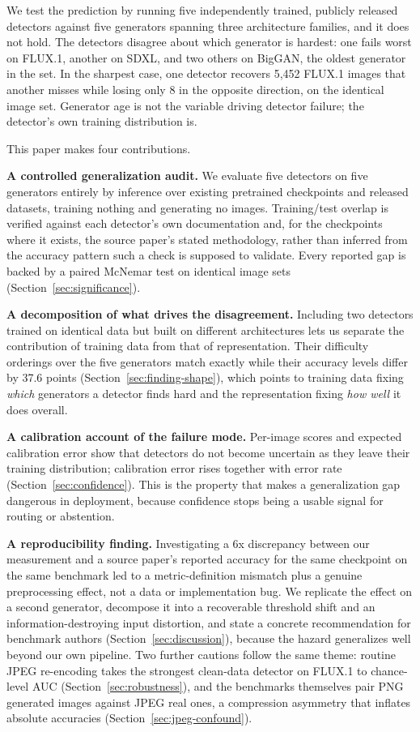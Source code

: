 \documentclass[3p,times,procedia]{elsarticle}
\begin{document}
We test the prediction by running five independently trained, publicly
released detectors against five generators spanning three architecture
families, and it does not hold. The detectors disagree about which
generator is hardest: one fails worst on FLUX.1, another on SDXL, and two
others on BigGAN, the oldest generator in the set. In the sharpest case,
one detector recovers 5{,}452 FLUX.1 images that another misses while
losing only 8 in the opposite direction, on the identical image set.
Generator age is not the variable driving detector failure; the detector's
own training distribution is.

This paper makes four contributions.

\textbf{A controlled generalization audit.} We evaluate five detectors on
five generators entirely by inference over existing pretrained checkpoints
and released datasets, training nothing and generating no images.
Training/test overlap is verified against each detector's own documentation
and, for the checkpoints where it exists, the source paper's stated
methodology, rather than inferred from the accuracy pattern such a check is
supposed to validate. Every reported gap is backed by a paired McNemar test
on identical image sets (Section~\ref{sec:significance}).

\textbf{A decomposition of what drives the disagreement.} Including two
detectors trained on identical data but built on different architectures
lets us separate the contribution of training data from that of
representation. Their difficulty orderings over the five generators match
exactly while their accuracy levels differ by 37.6 points
(Section~\ref{sec:finding-shape}), which points to training data fixing
\emph{which} generators a detector finds hard and the representation fixing
\emph{how well} it does overall.

\textbf{A calibration account of the failure mode.} Per-image scores and
expected calibration error show that detectors do not become uncertain as
they leave their training distribution; calibration error rises together
with error rate (Section~\ref{sec:confidence}). This is the property that
makes a generalization gap dangerous in deployment, because confidence
stops being a usable signal for routing or abstention.

\textbf{A reproducibility finding.} Investigating a 6x discrepancy between
our measurement and a source paper's reported accuracy for the same
checkpoint on the same benchmark led to a metric-definition mismatch plus a
genuine preprocessing effect, not a data or implementation bug. We
replicate the effect on a second generator, decompose it into a recoverable
threshold shift and an information-destroying input distortion, and state a
concrete recommendation for benchmark authors
(Section~\ref{sec:discussion}), because the hazard generalizes well beyond
our own pipeline. Two further cautions follow the same theme: routine JPEG
re-encoding takes the strongest clean-data detector on FLUX.1 to
chance-level AUC (Section~\ref{sec:robustness}), and the benchmarks
themselves pair PNG generated images against JPEG real ones, a compression
asymmetry that inflates absolute accuracies
(Section~\ref{sec:jpeg-confound}).
\end{document}
